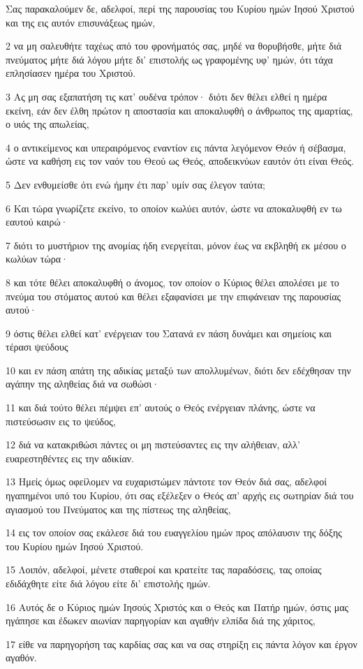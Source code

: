\par Σας παρακαλούμεν δε, αδελφοί, περί της παρουσίας του Κυρίου ημών Ιησού Χριστού και της εις αυτόν επισυνάξεως ημών,
\par 2 να μη σαλευθήτε ταχέως από του φρονήματός σας, μηδέ να θορυβήσθε, μήτε διά πνεύματος μήτε διά λόγου μήτε δι' επιστολής ως γραφομένης υφ' ημών, ότι τάχα επλησίασεν ημέρα του Χριστού.
\par 3 Ας μη σας εξαπατήση τις κατ' ουδένα τρόπον· διότι δεν θέλει ελθεί η ημέρα εκείνη, εάν δεν έλθη πρώτον η αποστασία και αποκαλυφθή ο άνθρωπος της αμαρτίας, ο υιός της απωλείας,
\par 4 ο αντικείμενος και υπεραιρόμενος εναντίον εις πάντα λεγόμενον Θεόν ή σέβασμα, ώστε να καθήση εις τον ναόν του Θεού ως Θεός, αποδεικνύων εαυτόν ότι είναι Θεός.
\par 5 Δεν ενθυμείσθε ότι ενώ ήμην έτι παρ' υμίν σας έλεγον ταύτα;
\par 6 Και τώρα γνωρίζετε εκείνο, το οποίον κωλύει αυτόν, ώστε να αποκαλυφθή εν τω εαυτού καιρώ·
\par 7 διότι το μυστήριον της ανομίας ήδη ενεργείται, μόνον έως να εκβληθή εκ μέσου ο κωλύων τώρα·
\par 8 και τότε θέλει αποκαλυφθή ο άνομος, τον οποίον ο Κύριος θέλει απολέσει με το πνεύμα του στόματος αυτού και θέλει εξαφανίσει με την επιφάνειαν της παρουσίας αυτού·
\par 9 όστις θέλει ελθεί κατ' ενέργειαν του Σατανά εν πάση δυνάμει και σημείοις και τέρασι ψεύδους
\par 10 και εν πάση απάτη της αδικίας μεταξύ των απολλυμένων, διότι δεν εδέχθησαν την αγάπην της αληθείας διά να σωθώσι·
\par 11 και διά τούτο θέλει πέμψει επ' αυτούς ο Θεός ενέργειαν πλάνης, ώστε να πιστεύσωσιν εις το ψεύδος,
\par 12 διά να κατακριθώσι πάντες οι μη πιστεύσαντες εις την αλήθειαν, αλλ' ευαρεστηθέντες εις την αδικίαν.
\par 13 Ημείς όμως οφείλομεν να ευχαριστώμεν πάντοτε τον Θεόν διά σας, αδελφοί ηγαπημένοι υπό του Κυρίου, ότι σας εξέλεξεν ο Θεός απ' αρχής εις σωτηρίαν διά του αγιασμού του Πνεύματος και της πίστεως της αληθείας,
\par 14 εις τον οποίον σας εκάλεσε διά του ευαγγελίου ημών προς απόλαυσιν της δόξης του Κυρίου ημών Ιησού Χριστού.
\par 15 Λοιπόν, αδελφοί, μένετε σταθεροί και κρατείτε τας παραδόσεις, τας οποίας εδιδάχθητε είτε διά λόγου είτε δι' επιστολής ημών.
\par 16 Αυτός δε ο Κύριος ημών Ιησούς Χριστός και ο Θεός και Πατήρ ημών, όστις μας ηγάπησε και έδωκεν αιωνίαν παρηγορίαν και αγαθήν ελπίδα διά της χάριτος,
\par 17 είθε να παρηγορήση τας καρδίας σας και να σας στηρίξη εις πάντα λόγον και έργον αγαθόν.


